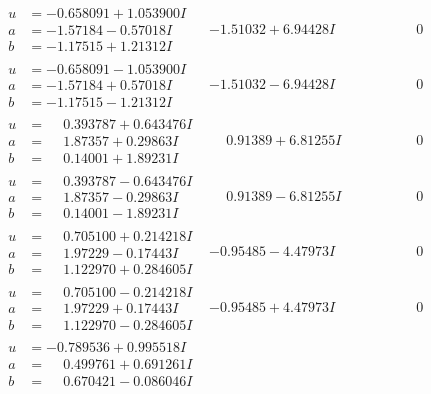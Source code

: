 \documentclass[1p]{elsarticle_modified}
\theoremstyle{definition}
\begin{document}
$$\begin{array}{c|c|c}
\begin{aligned}
u &= -0.658091 + 1.053900 I \\
a &= -1.57184 - 0.57018 I \\
b &= -1.17515 + 1.21312 I\end{aligned}
 & -1.51032 + 6.94428 I & \phantom{-0.000000 } 0 \\ \hline\begin{aligned}
u &= -0.658091 - 1.053900 I \\
a &= -1.57184 + 0.57018 I \\
b &= -1.17515 - 1.21312 I\end{aligned}
 & -1.51032 - 6.94428 I & \phantom{-0.000000 } 0 \\ \hline\begin{aligned}
u &= \phantom{-}0.393787 + 0.643476 I \\
a &= \phantom{-}1.87357 + 0.29863 I \\
b &= \phantom{-}0.14001 + 1.89231 I\end{aligned}
 & \phantom{-}0.91389 + 6.81255 I & \phantom{-0.000000 } 0 \\ \hline\begin{aligned}
u &= \phantom{-}0.393787 - 0.643476 I \\
a &= \phantom{-}1.87357 - 0.29863 I \\
b &= \phantom{-}0.14001 - 1.89231 I\end{aligned}
 & \phantom{-}0.91389 - 6.81255 I & \phantom{-0.000000 } 0 \\ \hline\begin{aligned}
u &= \phantom{-}0.705100 + 0.214218 I \\
a &= \phantom{-}1.97229 - 0.17443 I \\
b &= \phantom{-}1.122970 + 0.284605 I\end{aligned}
 & -0.95485 - 4.47973 I & \phantom{-0.000000 } 0 \\ \hline\begin{aligned}
u &= \phantom{-}0.705100 - 0.214218 I \\
a &= \phantom{-}1.97229 + 0.17443 I \\
b &= \phantom{-}1.122970 - 0.284605 I\end{aligned}
 & -0.95485 + 4.47973 I & \phantom{-0.000000 } 0 \\ \hline\begin{aligned}
u &= -0.789536 + 0.995518 I \\
a &= \phantom{-}0.499761 + 0.691261 I \\
b &= \phantom{-}0.670421 - 0.086046 I\end{aligned}

\end{array}$$
\end{document}

